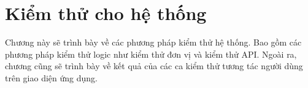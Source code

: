 \section{Kiểm thử cho hệ thống}

Chương này sẽ trình bày về các phương pháp kiểm thử hệ thống. Bao gồm các phương pháp kiểm thử logic như kiểm thử đơn vị và kiểm thử API. Ngoài ra, chương cũng sẽ trình bày về kết quả của các ca kiểm thử tương tác người dùng trên giao diện ứng dụng.



